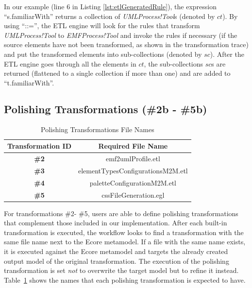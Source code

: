 
In our example (line 6 in Listing \ref{lst:etlGeneratedRule}), the expression ``s.familiarWith'' returns a collection of \emph{UMLProcess!Tool}s (denoted by $ct$). By using ``::='', the ETL engine will look for the rules that transform \emph{UMLProcess!Tool} to \emph{EMFProcess!Tool} and invoke the rules if 
necessary (if the source elements have not been transformed, as shown in the transformation trace) and put the transformed elements into sub-collections 
(denoted by $sc$). 
After the ETL engine goes through all the elements in $ct$, the sub-collections $sc$s are returned (flattened to a single collection if more than one) and are added to ``t.familiarWith''.



\subsection{Polishing Transformations (\#2b - \#5b)} 
\label{sec:transformationPatches}

\begin{table}[h]
	\caption{Polishing Transformations File Names}
	\centering
	\setlength{\tabcolsep}{3.5pt} 
	\begin{tabular}{|c|c|}
		\cline{1-2}
		\textbf{Transformation ID}  & \textbf{Required File Name}\\ \hline
		\textbf{\#2} & emf2umlProfile.etl\\ \hline
		\textbf{\#3} & elementTypesConfigurationsM2M.etl\\ \hline
		\textbf{\#4} & paletteConfigurationM2M.etl\\ \hline
		\textbf{\#5} & cssFileGeneration.egl\\ \hline
		\cline{1-2}
	\end{tabular}
	\label{tab:polishingTransformationsNames}
\end{table}

For transformations \#2- \#5, users are able to define polishing transformations that complement those included in our implementation. 
After each built-in transformation is executed, the workflow looks to find a transformation with the same file name next to the Ecore metamodel. 
If a file with the same name exists, it is executed against the Ecore metamodel and targets the already created output model of the original transformation. 
The execution of the polishing transformation is set \textit{not} to overwrite the target model but to refine it instead.
Table~\ref{tab:polishingTransformationsNames} shows the names that each polishing transformation is expected to have.

